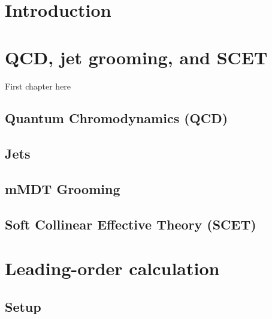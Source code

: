 \documentclass[12pt,twoside]{reedthesis}
\begin{document}
  \mainmatter %
  \pagestyle{fancyplain} %


\chapter*{Introduction}

	

	

\chapter{QCD, jet grooming, and SCET}
	
	First chapter here

	\section{Quantum Chromodynamics (QCD)}

	\section{Jets}

	\section{mMDT Grooming}

	\section{Soft Collinear Effective Theory (SCET)}


\chapter{Leading-order calculation}

	\section{Setup}
\end{document}
